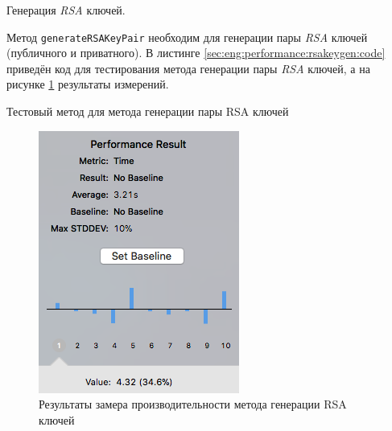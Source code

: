 \subsubsection{} Генерация \textit{RSA} ключей.
\label{sec:eng:performance:rsakeygen}

Метод \texttt{generateRSAKeyPair} необходим для генерации пары \textit{RSA} ключей (публичного и приватного). В листинге \ref{sec:eng:performance:rsakeygen:code} приведён код для тестирования метода генерации пары \textit{RSA} ключей, а на рисунке \ref{sec:eng:performance:rsakeygen:result} результаты измерений.

\begin{code}
  
   \caption{Тестовый метод для метода генерации пары RSA ключей}
   \label{sec:eng:performance:rsakeygen:code}
\end{code}

\begin{figure}[h]
  \centering
    \includegraphics{inc/img/perf/rsakeygen.png}
  \caption{Результаты замера производительности метода генерации RSA ключей}
  \label{sec:eng:performance:rsakeygen:result}
\end{figure}
